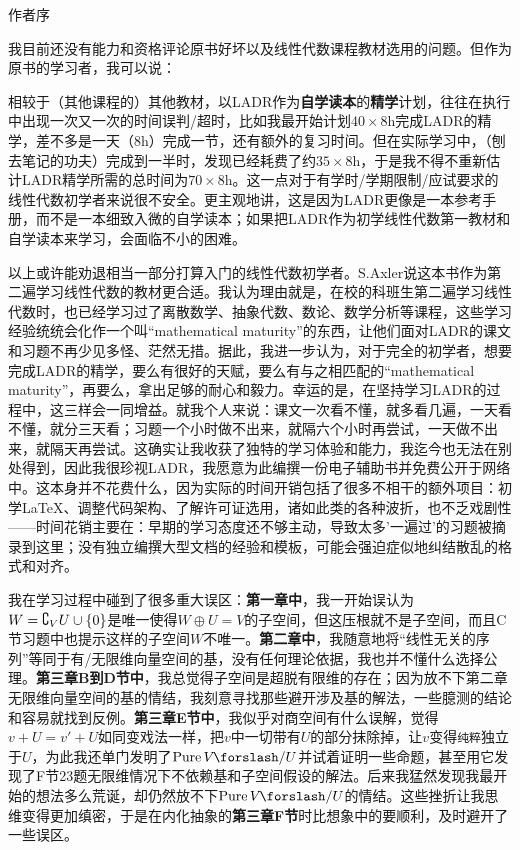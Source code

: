 \centerline{\Large 作者序}\vspace{6pt}\par
{\small 我目前还没有能力和资格评论原书好坏以及线性代数课程教材选用的问题。但作为原书的学习者，我可以说：\par\vspace{2pt}
相较于（其他课程的）其他教材，以LADR作为\textbf{自学读本}的\textbf{精学}计划，往往在执行中出现一次又一次的时间误判/超时，比如我最开始计划$40\times 8$h完成LADR的精学，差不多是一天（$8$h）完成一节，还有额外的复习时间。但在实际学习中，（刨去笔记的功夫）完成到一半时，发现已经耗费了约$35\times 8$h，于是我不得不重新估计LADR精学所需的总时间为$70\times 8$h。这一点对于有学时/学期限制/应试要求的线性代数初学者来说很不安全。更主观地讲，这是因为LADR更像是一本参考手册，而不是一本细致入微的自学读本；如果把LADR作为初学线性代数第一教材和自学读本来学习，会面临不小的困难。\par\vspace{4pt}
以上或许能劝退相当一部分打算入门的线性代数初学者。S.Axler说这本书作为第二遍学习线性代数的教材更合适。我认为理由就是，在校的科班生第二遍学习线性代数时，也已经学习过了离散数学、抽象代数、数论、数学分析等课程，这些学习经验统统会化作一个叫“mathematical maturity”的东西，让他们面对LADR的课文和习题不再少见多怪、茫然无措。据此，我进一步认为，对于完全的初学者，想要完成LADR的精学，要么有很好的天赋，要么有与之相匹配的“mathematical maturity”，再要么，拿出足够的耐心和毅力。幸运的是，在坚持学习LADR的过程中，这三样会一同增益。就我个人来说：课文一次看不懂，就多看几遍，一天看不懂，就分三天看；习题一个小时做不出来，就隔六个小时再尝试，一天做不出来，就隔天再尝试。这确实让我收获了独特的学习体验和能力，我迄今也无法在别处得到，因此我很珍视LADR，我愿意为此编撰一份电子辅助书并免费公开于网络中。这本身并不花费什么，因为实际的时间开销包括了很多不相干的额外项目：初学\LaTeX、调整代码架构、了解许可证选用，诸如此类的各种波折，也不乏戏剧性——时间花销主要在：早期的学习态度还不够主动，导致太多'一遍过'的习题被摘录到这里；没有独立编撰大型文档的经验和模板，可能会强迫症似地纠结散乱的格式和对齐。\par\vspace{4pt}
{\footnotesize 我在学习过程中碰到了很多重大误区：\textbf{第一章中}，我一开始误认为$W=\complement_V U\cup\text{\normalsize\{}0\text{\normalsize\}}$是唯一使得$W\oplus U=V$的子空间，但这压根就不是子空间，而且C节习题中也提示这样的子空间$W$不唯一。\textbf{第二章中}，我随意地将“线性无关的序列”等同于有/无限维向量空间的基，没有任何理论依据，我也并不懂什么选择公理。\textbf{第三章B到D节中}，我总觉得子空间是超脱有限维的存在；因为放不下第二章无限维向量空间的基的情结，我刻意寻找那些避开涉及基的解法，一些臆测的结论和容易就找到反例。\textbf{第三章E节中}，我似乎对商空间有什么误解，觉得$v+U=v'+U$如同变戏法一样，把$v$中一切带有$U$的部分抹除掉，让$v$变得\texttt{纯粹}独立于$U$，为此我还单门发明了$\text{Pure}\,V\XSlash U$并试着证明一些命题，甚至用它发现了F节23题无限维情况下不依赖基和子空间假设的解法。后来我猛然发现我最开始的想法多么荒诞，却仍然放不下$\text{Pure}\,V\XSlash U$的情结。这些挫折让我思维变得更加缜密，于是在内化抽象的\textbf{第三章F节}时比想象中的要顺利，及时避开了一些误区。
}\par\vspace{4pt}
}
\pagebreak


